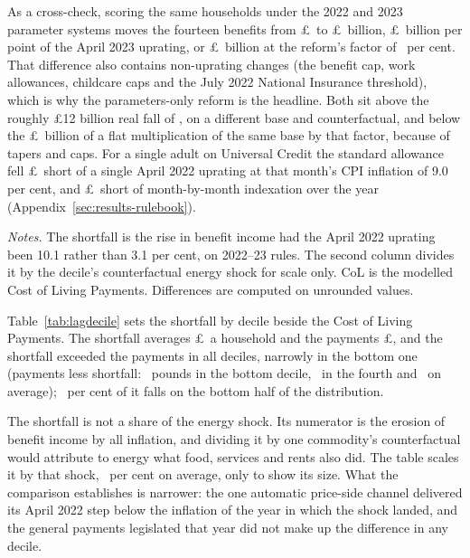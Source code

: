 As a cross-check, scoring the same households under the 2022 and 2023
parameter systems moves the fourteen benefits from
\pounds\SsVinBenefitBaseRuleTwentyTwo\ to
\pounds\SsVinBenefitBaseRuleTwentyThree\ billion,
\pounds\SsVinPerPointBn\ billion per point of the April 2023 uprating,
or \pounds\SsVinLagCostBn\ billion at the reform's factor of
\SsLagReformParameterFactorPct\ per cent.
That difference also contains non-uprating changes (the benefit cap,
work allowances, childcare caps and the July 2022 National Insurance
threshold), which is why the parameters-only reform is the headline. Both sit above the roughly \pounds 12 billion real fall
of \citet{obrwelfare2022}, on a different base and counterfactual, and
below the \pounds\SsLagReformFlatBn\ billion of a flat
multiplication of the same base by that factor, because of tapers and caps. For a single adult on
Universal Credit the standard allowance fell
\pounds\MsUcLagCostFlatAltGbp\ short of a single April 2022 uprating
at that month's CPI inflation of 9.0 per cent, and
\pounds\MsUcLagCostGbp\ short of month-by-month indexation over the
year (Appendix~\ref{sec:results-rulebook}).

\begin{table}[tbp]
\centering
\caption{The April 2022 uprating shortfall and the Cost of Living Payments by income decile, pounds per household, 2022--23}
\label{tab:lagdecile}
\small

\begin{minipage}{.8\textwidth}\footnotesize
\emph{Notes.} The shortfall is the rise in benefit income had the April
2022 uprating been 10.1 rather than 3.1 per cent, on 2022--23 rules.
The second column divides it by the decile's counterfactual energy
shock for scale only. CoL is the modelled Cost of Living Payments.
Differences are computed on unrounded values.
\end{minipage}
\end{table}

Table~\ref{tab:lagdecile} sets the shortfall by decile beside the Cost
of Living Payments. The shortfall averages \pounds\SsLagDecAllGbp\ a
household and the payments \pounds\SsLagDecAllColGbp, and the
shortfall exceeded the payments in all \numword{\SsLagDecNetNegativeCount}
deciles, narrowly in the bottom one
(payments less shortfall: \SsLagDecOneNetGbp\ pounds in the bottom
decile, \SsLagDecFourNetGbp\ in the fourth and \SsLagDecAllNetGbp\ on
average); \SsLagDecBottomHalfSharePct\ per cent of it
falls on the bottom half of the distribution.

The shortfall is not a share of the energy shock. Its numerator is the
erosion of benefit income by all inflation, and dividing it by one
commodity's counterfactual would attribute to energy what food,
services and rents also did. The table scales it by that shock,
\SsLagDecAllPctOfShock\ per cent on average, only to show its size.
What the comparison establishes is narrower: the one automatic
price-side channel delivered its April 2022 step below the inflation
of the year in which the shock landed, and the general payments
legislated that year did not make up the difference in any decile.

